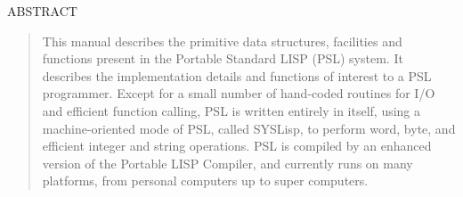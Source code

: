 %


\pagestyle{empty}
\newpage
\begin{center}
{ABSTRACT}\\[4mm]
\end{center}
\begin{quote}

This manual describes the primitive data structures, facilities and
functions present in the Portable Standard LISP
(PSL)  system.    It  describes  the  implementation details and
functions of interest to a PSL programmer.  Except for  a  small
number  of  hand-coded  routines  for I/O and efficient function
calling,  PSL  is  written   entirely   in   itself,   using   a
machine-oriented  mode  of PSL, called SYSLisp, to perform word,
byte, and efficient  integer  and  string  operations.   PSL  is
compiled  by  an enhanced version of the Portable LISP Compiler,
and currently runs on many platforms, from personal computers up
to super computers.
\end{quote}

\newpage
\tableofcontents
\newpage
\setcounter{page}{0}
\pagestyle{headings}
